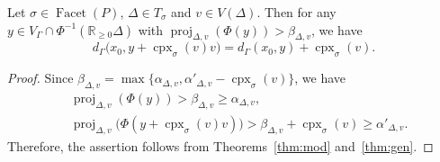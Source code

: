 \begin{thm}\label{thm:free}
Let $\sigma \in \operatorname{Facet}(P)$, $\Delta \in T_{\sigma}$ and $v \in V(\Delta)$. 
Then for any $y \in V_{\Gamma} \cap \Phi ^{-1}(\mathbb{R}_{\ge 0} \Delta)$ with $\operatorname{proj}_{\Delta, v} (\Phi(y)) > \beta _{\Delta, v}$, we have  
\[
d_{\Gamma}\bigl( x_0, y + \operatorname{cpx}_{\sigma}(v)v \bigr) 
= d_{\Gamma}( x_0, y) + \operatorname{cpx}_{\sigma}(v). 
\]
\end{thm}
\begin{proof}
Since $\beta_{\Delta, v} = \max \bigl\{ \alpha _{\Delta, v}, \alpha ' _{\Delta, v} - \operatorname{cpx}_{\sigma}(v) \bigr\}$, we have
\begin{align*}
&\operatorname{proj}_{\Delta, v} (\Phi(y)) > \beta _{\Delta, v}  \ge \alpha _{\Delta, v}, \\
&\operatorname{proj}_{\Delta, v} \bigl( \Phi(y + \operatorname{cpx}_{\sigma}(v)v ) \bigr) 
> \beta _{\Delta, v} + \operatorname{cpx}_{\sigma}(v) \ge \alpha' _{\Delta, v}. 
\end{align*}
Therefore, the assertion follows from Theorems~\ref{thm:mod} and~\ref{thm:gen}. 
\end{proof}

